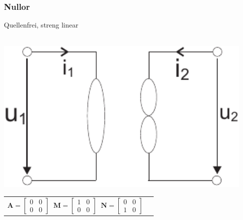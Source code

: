 \documentclass[a4paper,twocolumn,10pt]{article}
\begin{document}
\subsubsection*{Nullor}
Quellenfrei, streng linear\\\\
\begin{minipage}[b]{0.13\textwidth}
\includegraphics[width=0.95\textwidth]{Grafiken/OP_Nullor}
\end{minipage}
\hfill
\begin{minipage}[b]{0.33\textwidth}
\begin{tabular}{ll}
$\textbf{A}=\begin{bmatrix}0 & 0\\ 0 & 0\end{bmatrix}\;\;\textbf{M}=\begin{bmatrix}1 & 0\\ 0 & 0\end{bmatrix}\;\;\textbf{N}=\begin{bmatrix}0 & 0\\ 1 & 0\end{bmatrix}$
\end{tabular}\\
\end{minipage}
\end{document}
